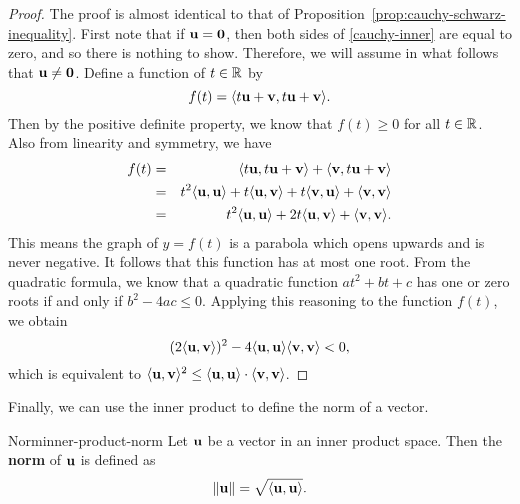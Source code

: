 \begin{proof}
  The proof is almost identical to that of
  Proposition~\ref{prop:cauchy-schwarz-inequality}.  First note that if
  $\vect{u}=\vect{0}$, then both sides of {\eqref{cauchy-inner}} are
  equal to zero, and so there is nothing to show. Therefore, we will
  assume in what follows that $\vect{u}\neq \vect{0}$.  Define a
  function of $t\in \mathbb{R}$ by
  \begin{equation*}
    f(t) = \iprod{t\vect{u}+\vect{v}, t\vect{u}+\vect{v}}.
  \end{equation*}
  Then by the positive definite property, we know that $f(t)\geq 0$
  for all $t\in \mathbb{R}$.  Also from linearity and symmetry, we have
  \begin{eqnarray*}
    f(t) &=& \iprod{t\vect{u}, t\vect{u}+\vect{v}} +
             \iprod{\vect{v}, t\vect{u}+\vect{v}} \\
         &=& t^2\iprod{\vect{u}, \vect{u}}+t\iprod{\vect{u}, \vect{v}} + t\iprod{\vect{v}, \vect{u}}+
             \iprod{\vect{v}, \vect{v}} \\
         &=&t^2\iprod{\vect{u},\vect{u}}+2t\iprod{\vect{u}, \vect{v}}
             + \iprod{\vect{v}, \vect{v}}.
  \end{eqnarray*}
  This means the graph of $y=f(t)$ is a parabola which opens upwards
  and is never negative. It follows that this function has at most one
  root. From the quadratic formula, we know that a quadratic function
  $at^2+bt+c$ has one or zero roots if and only if $b^2-4ac\leq
  0$. Applying this reasoning to the function $f(t)$, we obtain
  \begin{equation*}
    (2\iprod{\vect{u}, \vect{v}})^2
    - 4\iprod{\vect{u},\vect{u}}\iprod{\vect{v},\vect{v}} < 0,
  \end{equation*}
  which is equivalent to
  $\iprod{\vect{u},\vect{v}}^2 \leq \iprod{\vect{u},\vect{u}} \cdot
  \iprod{\vect{v},\vect{v}}$.
\end{proof}

Finally, we can use the inner product to define the norm of a vector.

\begin{definition}{Norm}{inner-product-norm}
  Let $\vect{u}$ be a vector in an inner product space. Then the
  \textbf{norm}%
   of $\vect{u}$ is defined as
  \begin{equation*}
    \norm{\vect{u}} = \sqrt{\iprod{\vect{u},\vect{u}}}.
  \end{equation*}
\end{definition}

